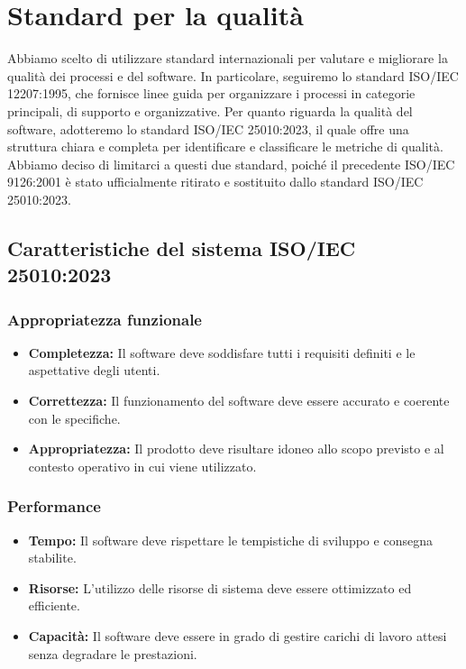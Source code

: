 \section{Standard per la qualità}

Abbiamo scelto di utilizzare standard internazionali per valutare e migliorare la qualità dei processi e del software. In particolare, seguiremo lo standard ISO/IEC 12207:1995, che fornisce linee guida per organizzare i processi in categorie principali, di supporto e organizzative.
Per quanto riguarda la qualità del software, adotteremo lo standard ISO/IEC 25010:2023, il quale offre una struttura chiara e completa per identificare e classificare le metriche di qualità. Abbiamo deciso di limitarci a questi due standard, poiché il precedente ISO/IEC 9126:2001 è stato ufficialmente ritirato e sostituito dallo standard ISO/IEC 25010:2023.

\subsection{Caratteristiche del sistema ISO/IEC 25010:2023}

\subsubsection{Appropriatezza funzionale}
\begin{itemize}
    \item \textbf{Completezza:} Il software deve soddisfare tutti i requisiti definiti e le aspettative degli utenti.
    \item \textbf{Correttezza:} Il funzionamento del software deve essere accurato e coerente con le specifiche.
    \item \textbf{Appropriatezza:} Il prodotto deve risultare idoneo allo scopo previsto e al contesto operativo in cui viene utilizzato.
\end{itemize}

\subsubsection{Performance}
\begin{itemize}
    \item \textbf{Tempo:} Il software deve rispettare le tempistiche di sviluppo e consegna stabilite.
    \item \textbf{Risorse:} L'utilizzo delle risorse di sistema deve essere ottimizzato ed efficiente.
    \item \textbf{Capacità:} Il software deve essere in grado di gestire carichi di lavoro attesi senza degradare le prestazioni.
\end{itemize}

